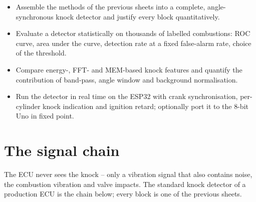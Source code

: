 
\begin{goals}
\begin{itemize}
  \item Assemble the methods of the previous sheets into a complete,
    angle-synchronous knock detector and justify every block quantitatively.
  \item Evaluate a detector statistically on thousands of labelled combustions:
    ROC curve, area under the curve, detection rate at a fixed false-alarm rate,
    choice of the threshold.
  \item Compare energy-, FFT- and MEM-based knock features and quantify the
    contribution of band-pass, angle window and background normalisation.
  \item Run the detector in real time on the ESP32 with crank synchronisation,
    per-cylinder knock indication and ignition retard; optionally port it to the
    8-bit Uno in fixed point.
\end{itemize}
\end{goals}

\section*{The signal chain}

\ecuquote{} The ECU never sees the knock -- only a vibration signal that also
contains noise, the combustion vibration and valve impacts. The standard knock
detector of a production ECU is the chain below; every block is one of the
previous sheets.

\begin{center}
\end{center}

